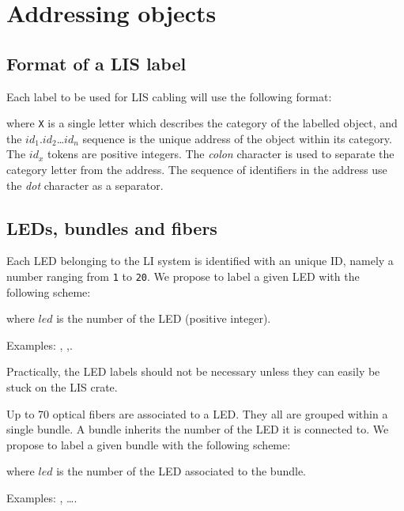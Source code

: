 \documentclass[12pt,a4paper]{article}
\begin{document}
\pagebreak
\section{Addressing objects}

\subsection{Format of a LIS label}

Each label to be used for LIS cabling will use the following format:

\begin{center}
\end{center}
\noindent  where \texttt{X}  is a  single letter  which describes  the
category  of the  labelled  object,  and the  $id_1$.$id_2$\dots$id_n$
sequence is the unique address of the object within its category.  The
$id_x$ tokens  are positive  integers.  The \emph{colon}  character is
used to separate  the category letter from the  address.  The sequence
of  identifiers in  the  address  use the  \emph{dot}  character as  a
separator.


\subsection{LEDs, bundles and fibers}

Each LED belonging  to the LI system is identified  with an unique ID,
namely a number ranging from \texttt{1} to  \texttt{20}.
We propose to label a given LED
with the following scheme:
\begin{center}
\end{center}
where \texttt{$led$} is the number of the LED (positive integer).
\vskip 10pt
\par\noindent Examples: , 
,.
\vskip 10pt
\par Practically, the LED labels should not be necessary unless
they can easily be stuck on the LIS crate.

\vskip 10pt

\par\noindent Up  to 70 optical fibers  are associated to a  LED. They
all are grouped within a single  bundle.  A bundle inherits the number
of the  LED it is  connected to.  We propose  to label a  given bundle
with the following scheme:
\begin{center}
\end{center}
where \texttt{$led$} is the number of the LED associated to the bundle.
\vskip 10pt
\par\noindent Examples: , 
\dots{}.
 
\end{document}
